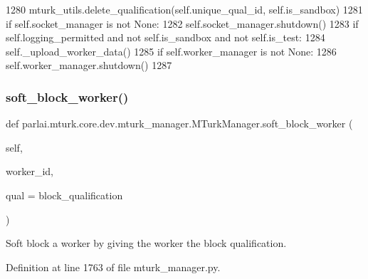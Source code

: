 \begin{DoxyCode}
1280                 mturk\_utils.delete\_qualification(self.unique\_qual\_id, self.is\_sandbox)
1281             \textcolor{keywordflow}{if} self.socket\_manager \textcolor{keywordflow}{is} \textcolor{keywordflow}{not} \textcolor{keywordtype}{None}:
1282                 self.socket\_manager.shutdown()
1283             \textcolor{keywordflow}{if} self.logging\_permitted \textcolor{keywordflow}{and} \textcolor{keywordflow}{not} self.is\_sandbox \textcolor{keywordflow}{and} \textcolor{keywordflow}{not} self.is\_test:
1284                 self.\_upload\_worker\_data()
1285             \textcolor{keywordflow}{if} self.worker\_manager \textcolor{keywordflow}{is} \textcolor{keywordflow}{not} \textcolor{keywordtype}{None}:
1286                 self.worker\_manager.shutdown()
1287 
\end{DoxyCode}
\mbox{\label{classparlai_1_1mturk_1_1core_1_1dev_1_1mturk__manager_1_1MTurkManager_a49b4bffc7ffa32c280822cf9e21b5e24}} 
\subsubsection{\texorpdfstring{soft\+\_\+block\+\_\+worker()}{soft\_block\_worker()}}
{\footnotesize\ttfamily def parlai.\+mturk.\+core.\+dev.\+mturk\+\_\+manager.\+M\+Turk\+Manager.\+soft\+\_\+block\+\_\+worker (\begin{DoxyParamCaption}\item[{}]{self,  }\item[{}]{worker\+\_\+id,  }\item[{}]{qual = {\ttfamily \textquotesingle{}block\+\_\+qualification\textquotesingle{}} }\end{DoxyParamCaption})}

\begin{DoxyVerb}Soft block a worker by giving the worker the block qualification.
\end{DoxyVerb}
 

Definition at line 1763 of file mturk\+\_\+manager.\+py.



